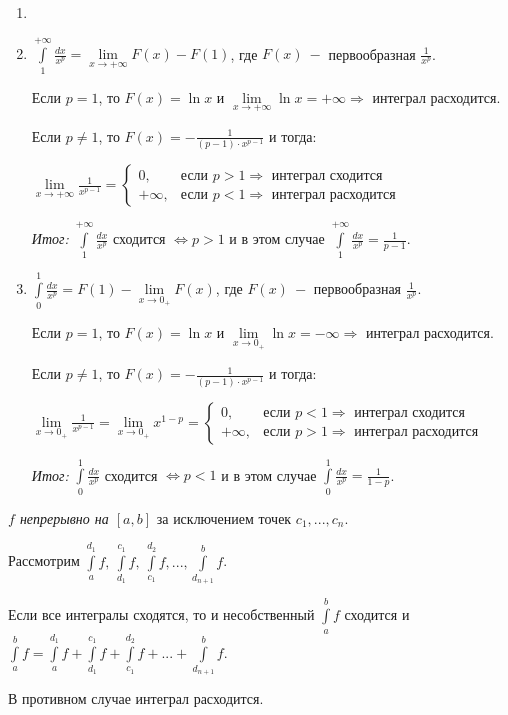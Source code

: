 \begin{example}
    \begin{enumerate}
        \item[]
        \item $\int\limits_1^{+\infty }\frac{dx}{x^p}=\lim\limits_{x\rightarrow +\infty}F(x)-F(1)$, где $F(x)\ -$ первообразная $\frac{1}{x^p}$.

        Если $p=1$, то $F(x)=\ln x$ и $\lim\limits_{x\rightarrow +\infty}\ln x=+\infty\Rightarrow$ интеграл расходится.

        Если $p\neq1$, то $F(x)=-\frac{1}{(p-1)\cdot x^{p-1}}$ и тогда:
        
        $\lim\limits_{x\rightarrow +\infty}\frac{1}{x^{p-1}}=\begin{cases} 
        0, & \text{если $p>1\Rightarrow$ интеграл сходится} \\
        +\infty, & \text{если $p<1\Rightarrow$ интеграл расходится}
        \end{cases}$ 

        \textit{Итог:} $\int\limits_1^{+\infty }\frac{dx}{x^p}$ сходится $\Leftrightarrow p>1$ и в этом случае $\int\limits_1^{+\infty }\frac{dx}{x^p}=\frac{1}{p-1}$.
        \item $\int\limits_0^1\frac{dx}{x^p}=F(1)-\lim\limits_{x\rightarrow 0_+}F(x)$, где $F(x)\ -$ первообразная $\frac{1}{x^p}$.

        Если $p=1$, то $F(x)=\ln x$ и $\lim\limits_{x\rightarrow 0_+}\ln x=-\infty\Rightarrow$ интеграл расходится.

        Если $p\neq1$, то $F(x)=-\frac{1}{(p-1)\cdot x^{p-1}}$ и тогда:
        
        $\lim\limits_{x\rightarrow 0_+}\frac{1}{x^{p-1}}=\lim\limits_{x\rightarrow 0_+}x^{1-p}=\begin{cases} 
        0, & \text{если $p<1\Rightarrow$ интеграл сходится} \\
        +\infty, & \text{если $p>1\Rightarrow$ интеграл расходится}
        \end{cases}$ 

        \textit{Итог:} $\int\limits_0^1\frac{dx}{x^p}$ сходится $\Leftrightarrow p<1$ и в этом случае $\int\limits_0^1\frac{dx}{x^p}=\frac{1}{1-p}$.
    \end{enumerate}
\end{example}

\begin{definition}
\textit{    $f$ \textit{непрерывно на} $[a, b]$ }за исключением точек $c_1, ..., c_n$. 
    
    Рассмотрим $\int\limits_a^{d_1} f,\ \int\limits_{d_1}^{c_1} f,\ \int\limits_{c_1}^{d_2} f, ...,  \int\limits_{d_{n+1}}^{b} f$.
    
    Если все интегралы сходятся, то и несобственный $\int\limits_a^b f$ сходится и $\int\limits_a^b f=\int\limits_a^{d_1} f+\int\limits_{d_1}^{c_1} f+ \int\limits_{c_1}^{d_2} f+...+ \int\limits_{d_{n+1}}^{b} f$. 

    В противном случае интеграл расходится.
\end{definition}

